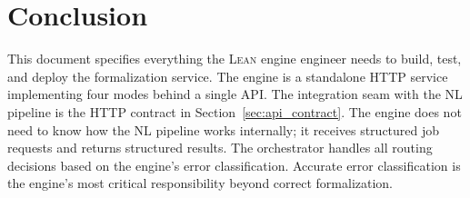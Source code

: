 \documentclass[11pt,a4paper]{article}
\newcommand{\Lean}{\textsc{Lean}}
\begin{document}
\section{Conclusion}

This document specifies everything the \Lean{} engine engineer needs to build, test, and deploy the formalization service. The engine is a standalone HTTP service implementing four modes behind a single API. The integration seam with the NL pipeline is the HTTP contract in Section~\ref{sec:api_contract}. The engine does not need to know how the NL pipeline works internally; it receives structured job requests and returns structured results. The orchestrator handles all routing decisions based on the engine's error classification. Accurate error classification is the engine's most critical responsibility beyond correct formalization.
\end{document}

